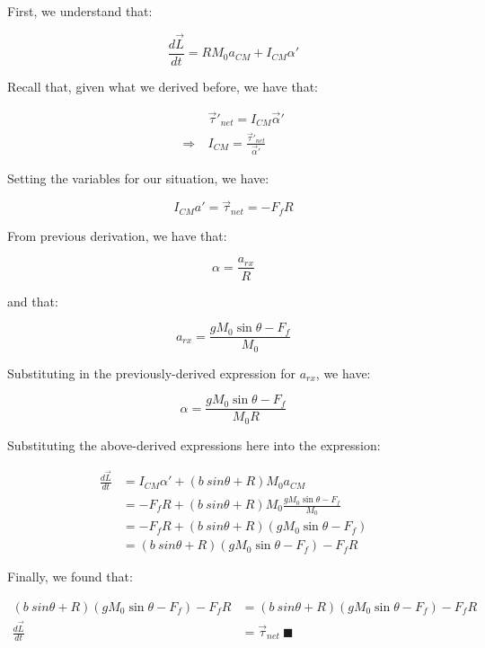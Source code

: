 \documentclass[letterpaper]{article}
\begin{document}
First, we understand that:

\begin{equation}
   \frac{d\vec{L}}{dt} = RM_0 a_{CM} + I_{CM}\alpha' 
\end{equation}

Recall that, given what we derived before, we have that:

\begin{align}
   &\vec{\tau}'_{net} = I_{CM} \vec{\alpha}'\\
\Rightarrow\ & I_{CM} = \frac{\vec{\tau}'_{net}}{\vec{\alpha}'}
\end{align}

Setting the variables for our situation, we have:

\begin{equation}
   I_{CM}a' = \vec{\tau}_{net} = - F_fR
\end{equation}

From previous derivation, we have that:

\begin{equation}
    \alpha = \frac{a_{rx}}{R}
\end{equation}

and that:

\begin{equation}
     a_{rx} = \frac{gM_0 \sin\theta - F_f}{M_0}
\end{equation}

Substituting in the previously-derived expression for \(a_{rx}\), we have:

\begin{equation}
    \alpha = \frac{gM_0 \sin\theta - F_f}{M_0R}
\end{equation}

Substituting the above-derived expressions here into the expression:

\begin{align}
   \frac{d\vec{L}}{dt} &= I_{CM}\alpha' + (b\ sin\theta + R)M_0 a_{CM}\\
&= - F_fR + (b\ sin\theta + R)M_0 \frac{gM_0 \sin\theta - F_f}{M_0}\\
&= - F_fR + (b\ sin\theta + R)(gM_0 \sin\theta - F_f)\\
&= (b\ sin\theta + R)(gM_0 \sin\theta - F_f)- F_fR 
\end{align}

Finally, we found that:

\begin{align}
    (b\ sin\theta + R)(gM_0 \sin\theta - F_f)- F_fR &= (b\ sin\theta + R)(gM_0 \sin\theta - F_f)- F_fR\\
\frac{d\vec{L}}{dt} &= \vec{\tau}_{net}\ \blacksquare
\end{align}
\end{document}

